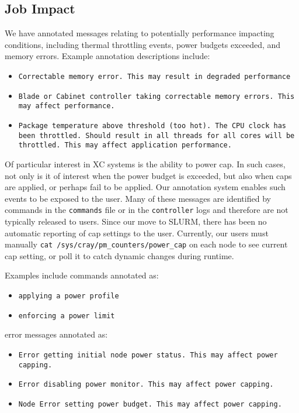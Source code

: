 \subsection{Job Impact}
\label{s:jobimpact}

We have annotated messages relating to potentially performance impacting conditions, including
thermal throttling events, power budgets exceeded, and memory errors. Example annotation
descriptions  include:
\begin{itemize}
\item \scriptsize\texttt{Correctable memory error.  This may result in degraded performance}\normalsize
\item \scriptsize\texttt{Blade or Cabinet controller taking correctable memory errors. This may affect performance.}\normalsize
\item \scriptsize\texttt{Package temperature above threshold (too hot). The CPU clock has been throttled. Should result in all threads for all cores will be throttled. This may affect application performance.}\normalsize
\end{itemize}

Of particular interest in XC systems is the ability to power cap. In such cases, not only is it of interest when
the power budget is exceeded, but also when caps are applied, or perhaps fail to be applied. Our annotation
system enables such events to be exposed to the user.
Many of these messages are identified by commands in the \texttt{commands} file or in the \texttt{controller} logs
and therefore are not typically released to users.
Since our move to SLURM, there has been no automatic reporting of cap settings to the user.
Currently, our users must manually \texttt{cat /sys/cray/pm\_counters/power\_cap}
on each node to see current cap setting, or poll it to catch dynamic changes during runtime.

Examples include commands annotated as:
\begin{itemize}
\item \scriptsize\texttt{applying a power profile}\normalsize
\item \scriptsize\texttt{enforcing a power limit}\normalsize
\end{itemize}
error messages annotated as:
\begin{itemize}
\item \scriptsize\texttt{Error getting initial node power status. This may affect power capping.}\normalsize
\item \scriptsize\texttt{Error disabling power monitor. This may affect power capping.}\normalsize
\item \scriptsize\texttt{Node Error setting power budget. This may affect power capping.}\normalsize
\end{itemize}

